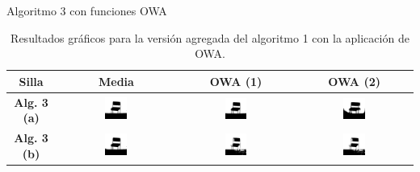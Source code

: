 \documentclass{beamer}
\theoremstyle{plain} %
\theoremstyle{definition}
\newcommand{\bb}{\bfseries}
\begin{document}
\begin{frame}{Algoritmo 3 con funciones OWA}
  \begin{table}
  \centering
  \begin{tabular}{c||c|c|c}
Silla                                &\bb Media&\bb OWA (1)&\bb OWA (2)\\\hline\hline
\bb Alg. 3 (a)  &  
\includegraphics[width=0.2\textwidth]{img/res/e7/alg3aowa1chair.jpg} &
\includegraphics[width=0.2\textwidth]{img/res/e7/alg3aowa2chair.jpg} &
\includegraphics[width=0.2\textwidth]{img/res/e7/alg3aowa3chair.jpg} \\
\bb Alg. 3 (b)  &   
\includegraphics[width=0.2\textwidth]{img/res/e7/alg3bowa1chair.jpg} &
\includegraphics[width=0.2\textwidth]{img/res/e7/alg3bowa2chair.jpg} &
\includegraphics[width=0.2\textwidth]{img/res/e7/alg3bowa3chair.jpg} \\\hline
  \end{tabular}
  \caption{Resultados gráficos para la versión agregada del algoritmo 1 con la aplicación de OWA.}
  \end{table}
\end{frame}
\end{document}
